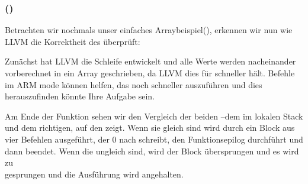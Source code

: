 \subsubsection{\OptimizingXcodeIV (\ThumbTwoMode)}
Betrachten wir nochmals unser einfaches Arraybeispiel(), erkennen wir nun wie LLVM die Korrektheit
des  überprüft:



Zunächst hat LLVM die Schleife entwickelt und alle Werte werden nacheinander vorberechnet in ein Array geschrieben, da
LLVM dies für schneller hält. 
Befehle im ARM mode können helfen, das noch schneller auszuführen und dies herauszufinden könnte Ihre Aufgabe sein.

Am Ende der Funktion sehen wir den Vergleich der beiden --dem im lokalen Stack und dem richtigen, auf den
 zeigt.
Wenn sie gleich sind wird durch  ein Block aus vier Befehlen ausgeführt, der 0 nach  schreibt, den
Funktionsepilog durchführt und dann beendet.
Wenn die  ungleich sind, wird der Block übersprungen und es wird zu \\
 gesprungen und die Ausführung wird angehalten.
